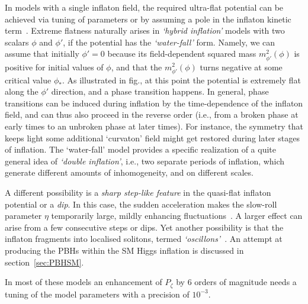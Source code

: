 In models with a single inflaton field, the required ultra-flat potential can be achieved via tuning of parameters or by assuming a pole in the inflaton kinetic term~\cite{PBHformationTh,HiggsPlateau}.
Extreme flatness naturally arises in {\em `hybrid inflation'} models with two scalars $\phi$ and $\phi'$, if the potential has the {\em `water-fall'} form.
Namely, we can assume that initially $\phi'=0$ because its 
field-dependent squared mass $m_{\phi'}^2(\phi)$ is positive for initial values of $\phi$,
and that the $m_{\phi'}^2(\phi)$ turns negative at some critical value $\phi_*$.
As illustrated in fig., at this point the potential is extremely flat along the $\phi'$ direction, and a phase transition happens.
In general, phase transitions  can be induced during inflation by the time-dependence of the inflaton field,
 and can thus also proceed in the reverse order (i.e., from a broken phase at early times to an unbroken phase at later times).
For instance, the symmetry that keeps light some additional `curvaton' field might get restored during later stages of inflation.
The `water-fall' model provides a specific realization of a quite general idea of {\em`double inflation'}, i.e., two separate periods of inflation,
which generate different amounts of inhomogeneity, and on different scales.

\smallskip

A different possibility is a {\em sharp step-like feature} in the quasi-flat inflaton potential
or a {\em dip}. In this case, the sudden acceleration makes  the slow-roll parameter $\eta$ temporarily
large, mildly enhancing fluctuations~\cite{PBHformationTh}.
A larger effect can arise from a few consecutive steps or dips.
Yet another possibility is that the inflaton fragments into localised solitons, termed {\em `oscillons'}~\cite{PBHformationOscillon}.
An attempt at producing the PBHs within the SM Higgs inflation is discussed in section~\ref{sec:PBHSM}.


In most of these models an enhancement of $P_\zeta$ by 6 orders of magnitude
needs a tuning of the model parameters with a precision of $10^{-3}$.



